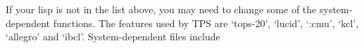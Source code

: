 % 
% 
% 
% 
% 
% 
% 
If your lisp is not in the list above, you may need to change some of the
system-dependent functions. The features used by TPS are `tops-20', `lucid',
`:cmu', `kcl', `allegro' and `ibcl'.  System-dependent files include


